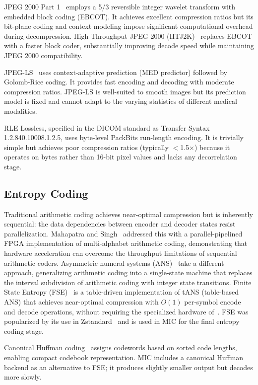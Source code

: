 \documentclass[11pt,twocolumn]{article}
\begin{document}
JPEG 2000 Part 1~\cite{jpeg2000} employs a 5/3 reversible integer wavelet transform with embedded block coding (EBCOT).
It achieves excellent compression ratios but its bit-plane coding and context modeling impose significant computational overhead during decompression.
High-Throughput JPEG 2000 (HTJ2K)~\cite{htj2k} replaces EBCOT with a faster block coder, substantially improving decode speed while maintaining JPEG 2000 compatibility.

JPEG-LS~\cite{jpegls} uses context-adaptive prediction (MED predictor) followed by Golomb-Rice coding.
It provides fast encoding and decoding with moderate compression ratios.
JPEG-LS is well-suited to smooth images but its prediction model is fixed and cannot adapt to the varying statistics of different medical modalities.

RLE Lossless, specified in the DICOM standard as Transfer Syntax 1.2.840.10008.1.2.5, uses byte-level PackBits run-length encoding.
It is trivially simple but achieves poor compression ratios (typically $<$1.5$\times$) because it operates on bytes rather than 16-bit pixel values and lacks any decorrelation stage.

\subsection{Entropy Coding}

Traditional arithmetic coding achieves near-optimal compression but is inherently sequential: the data dependencies between encoder and decoder states resist parallelization.
Mahapatra and Singh~\cite{mahapatra2007} addressed this with a parallel-pipelined FPGA implementation of multi-alphabet arithmetic coding, demonstrating that hardware acceleration can overcome the throughput limitations of sequential arithmetic coders.
Asymmetric numeral systems (ANS)~\cite{duda2009} take a different approach, generalizing arithmetic coding into a single-state machine that replaces the interval subdivision of arithmetic coding with integer state transitions.
Finite State Entropy (FSE)~\cite{collet2013} is a table-driven implementation of tANS (table-based ANS) that achieves near-optimal compression with $O(1)$ per-symbol encode and decode operations, without requiring the specialized hardware of~\cite{mahapatra2007}.
FSE was popularized by its use in Zstandard~\cite{zstd} and is used in MIC for the final entropy coding stage.

Canonical Huffman coding~\cite{schwartz1964} assigns codewords based on sorted code lengths, enabling compact codebook representation.
MIC includes a canonical Huffman backend as an alternative to FSE; it produces slightly smaller output but decodes more slowly.
\end{document}
